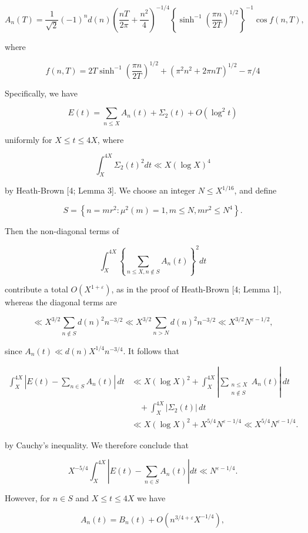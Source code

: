 \documentclass[10pt]{article}
\begin{document}
$$
A_{n}(T)=\frac{1}{\sqrt{2}}(-1)^{n} d(n)\left(\frac{n T}{2 \pi}+\frac{n^{2}}{4}\right)^{-1 / 4}\left\{\sinh ^{-1}\left(\frac{\pi n}{2 T}\right)^{1 / 2}\right\}^{-1} \cos f(n, T),
$$

where

$$
f(n, T)=2 T \sinh ^{-1}\left(\frac{\pi n}{2 T}\right)^{1 / 2}+\left(\pi^{2} n^{2}+2 \pi n T\right)^{1 / 2}-\pi / 4
$$

Specifically, we have

$$
E(t)=\sum_{n \leq X} A_{n}(t)+\Sigma_{2}(t)+O\left(\log ^{2} t\right)
$$

uniformly for $X \leq t \leq 4 X$, where

$$
\int_{X}^{4 X} \Sigma_{2}(t)^{2} d t \ll X(\log X)^{4}
$$

by Heath-Brown [4; Lemma 3]. We choose an integer $N \leq X^{1 / 16}$, and define

$$
S=\left\{n=m r^{2}: \mu^{2}(m)=1, m \leq N, m r^{2} \leq N^{4}\right\} .
$$

Then the non-diagonal terms of

$$
\int_{X}^{4 X}\left\{\sum_{n \leq X, n \notin S} A_{n}(t)\right\}^{2} d t
$$

contribute a total $O\left(X^{1+\varepsilon}\right)$, as in the proof of Heath-Brown [4; Lemma 1], whereas the diagonal terms are

$$
\ll X^{3 / 2} \sum_{n \notin S} d(n)^{2} n^{-3 / 2} \ll X^{3 / 2} \sum_{n>N} d(n)^{2} n^{-3 / 2} \ll X^{3 / 2} N^{\varepsilon-1 / 2},
$$

since $A_{n}(t) \ll d(n) X^{1 / 4} n^{-3 / 4}$. It follows that

$$
\begin{aligned}
\int_{X}^{4X}\left|E(t)-\sum_{n \in S}A_{n}(t)\right|\,dt
&\ll X(\log X)^{2}
 +\int_{X}^{4X}\left|\sum_{\substack{n \leq X\\ n \notin S}}A_{n}(t)\right|\,dt \\
&\quad+\int_{X}^{4X}|\Sigma_{2}(t)|\,dt \\
&\ll X(\log X)^{2}+X^{5/4}N^{\varepsilon-1/4}
 \ll X^{5/4}N^{\varepsilon-1/4}.
\end{aligned}
$$

by Cauchy's inequality. We therefore conclude that

$$
X^{-5 / 4} \int_{X}^{4 X}\left|E(t)-\sum_{n \in S} A_{n}(t)\right| d t \ll N^{\varepsilon-1 / 4} .
$$

However, for $n \in S$ and $X \leq t \leq 4 X$ we have

$$
A_{n}(t)=B_{n}(t)+O\left(n^{3 / 4+\varepsilon} X^{-1 / 4}\right),
$$
\end{document}
